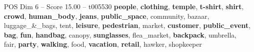 \begin{textsample}{POS Dim 6 – Score 15.00 – t005530}  \label{ex:f6_pos_034}
\textbf{people}, \textbf{clothing}, \textbf{temple}, \textbf{t-shirt}, \textbf{shirt}, \textbf{crowd}, \textbf{human\_body}, \textbf{jeans}, \textbf{public\_space}, community, bazaar, luggage\_\&\_bags, tent, \textbf{leisure}, \textbf{pedestrian}, market, \textbf{customer}, \textbf{public\_event}, \textbf{bag}, \textbf{fun}, \textbf{handbag}, canopy, \textbf{sunglasses}, flea\_market, \textbf{backpack}, umbrella, fair, \textbf{party}, \textbf{walking}, food, \textbf{vacation}, \textbf{retail}, hawker, shopkeeper

\end{textsample}
